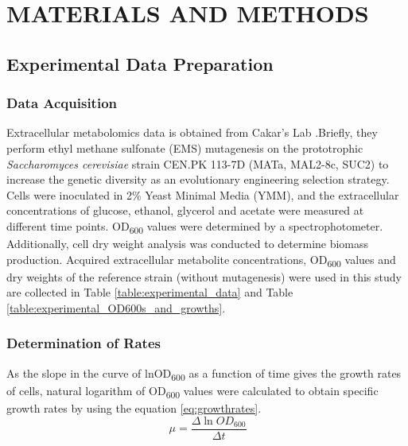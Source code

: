 \chapter{MATERIALS AND METHODS}

\section{Experimental Data Preparation}
\subsection{Data Acquisition}
Extracellular metabolomics data is obtained from Cakar's Lab \cite{arslan2018physiological}.Briefly, they perform ethyl methane sulfonate (EMS) mutagenesis  on the prototrophic \emph{Saccharomyces cerevisiae} strain CEN.PK 113-7D (MATa, MAL2-8c, SUC2) to increase the genetic diversity as an evolutionary engineering selection strategy. Cells were inoculated in 2\% Yeast Minimal Media (YMM), and the extracellular concentrations of glucose, ethanol, glycerol and acetate were measured at different time points. OD\textsubscript{600} values were determined by a spectrophotometer. Additionally, cell dry weight analysis was conducted to determine biomass production. Acquired extracellular metabolite concentrations, OD\textsubscript{600} values and dry weights of the reference strain (without mutagenesis) were used in this study are collected in Table \ref{table:experimental_data} and Table \ref{table:experimental_OD600s_and_growths}.




\subsection{Determination of Rates}
As the slope in the curve of lnOD\textsubscript{600} as a function of time gives the growth rates of cells, natural logarithm of OD\textsubscript{600} values were calculated to obtain specific growth rates by using the equation \ref{eq:growthrates}.
  \begin{equation}
      \ \mu = \frac{\Delta \ln{OD_{600}}}{\Delta t}
      \label{eq:growthrates}
  \end{equation}


